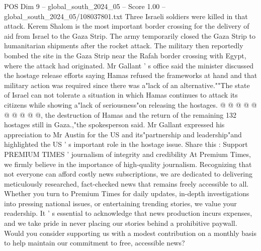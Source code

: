 \begin{textsample}{POS Dim 9 – global\_south\_2024\_05 – Score 1.00 – global\_south\_2024\_05/108037801.txt}
Three Israeli soldiers were killed in that attack.
Kerem Shalom is the most important border crossing for the delivery of aid from Israel to the Gaza Strip.
The army temporarily closed the Gaza Strip to humanitarian shipments after the rocket attack.
The military then reportedly bombed the site in the Gaza Strip near the Rafah border crossing with Egypt, where the attack had originated.
Mr Gallant ' s office said the minister discussed the hostage release efforts saying Hamas refused the frameworks at hand and that military action was required since there was a"lack of an alternative.""The state of Israel can not tolerate a situation in which Hamas continues to attack its citizens while showing a"lack of seriousness"on releasing the hostages. @ @ @ @ @ @ @ @ @ @, the destruction of Hamas and the return of the remaining 132 hostages still in Gaza.,"the spokesperson said.
Mr Gallant expressed his appreciation to Mr Austin for the US and its"partnership and leadership"and highlighted the US ' s important role in the hostage issue.
Share this : Support PREMIUM TIMES ' journalism of integrity and credibility At Premium Times, we firmly believe in the importance of high-quality journalism.
Recognizing that not everyone can afford costly news subscriptions, we are dedicated to delivering meticulously researched, fact-checked news that remains freely accessible to all.
Whether you turn to Premium Times for daily updates, in-depth investigations into pressing national issues, or entertaining trending stories, we value your readership.
It ' s essential to acknowledge that news production incurs expenses, and we take pride in never placing our stories behind a prohibitive paywall.
Would you consider supporting us with a modest contribution on a monthly basis to help maintain our commitment to free, accessible news?

\end{textsample}
